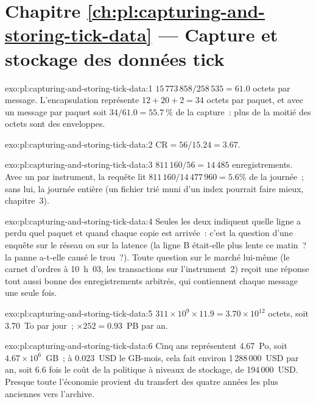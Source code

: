 \section*{Chapitre \ref{ch:pl:capturing-and-storing-tick-data} --- Capture et stockage des données tick}

\begin{solution}{exo:pl:capturing-and-storing-tick-data:1}
$15\,773\,858 / 258\,535 = 61.0$ octets par message. L'encapsulation représente $12 + 20 + 2 = 34$ octets par paquet, et avec un message par paquet
soit $34/61.0 = 55.7~\%$ de la capture~: plus de la moitié des octets sont des enveloppes.
\end{solution}

\begin{solution}{exo:pl:capturing-and-storing-tick-data:2}
$\mathrm{CR} = 56 / 15.24 = 3.67$.
\end{solution}

\begin{solution}{exo:pl:capturing-and-storing-tick-data:3}
$811\,160 / 56 = 14\,485$ enregistrements. Avec un  par instrument, la requête lit $811\,160 / 14\,477\,960 = 5.6\%$ de la journée~;
sans lui, la journée entière (un fichier trié muni d'un index pourrait faire mieux, chapitre~3).
\end{solution}

\begin{solution}{exo:pl:capturing-and-storing-tick-data:4}
Seules les deux  indiquent quelle ligne a perdu quel paquet et quand chaque copie est arrivée~: c'est la question d'une enquête sur le réseau ou sur la latence
(la ligne B était-elle plus lente ce matin~? la panne a-t-elle causé le trou~?). Toute question sur le marché lui-même (le carnet
d'ordres à 10~h~03, les transactions sur l'instrument~2) reçoit une réponse tout aussi bonne des enregistrements arbitrés, qui contiennent chaque message une seule fois.
\end{solution}

\begin{solution}{exo:pl:capturing-and-storing-tick-data:5}
$311\times10^9 \times 11.9 = 3.70\times10^{12}$ octets, soit 3.70~To par jour~; $\times 252 = 0.93$~PB par an.
\end{solution}

\begin{solution}{exo:pl:capturing-and-storing-tick-data:6}
Cinq ans représentent 4.67~Po, soit $4.67\times10^6$~GB~; à 0.023~USD le GB-mois, cela fait environ 1\,288\,000~USD par an, soit 6.6 fois le coût de la
politique à niveaux de stockage, de 194\,000~USD. Presque toute l'économie provient du transfert des quatre années les plus anciennes vers l'archive.
\end{solution}

